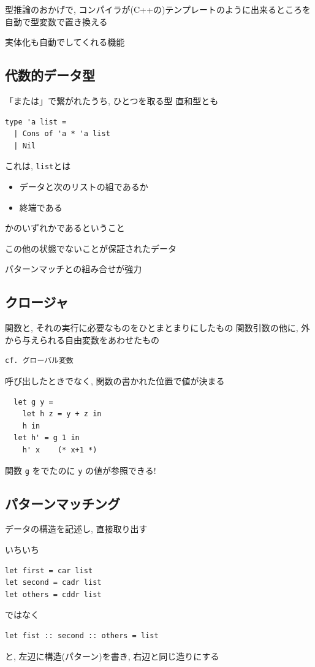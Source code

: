 \documentclass[papersize,30pt,slide]{jsarticle}
\begin{document}
型推論のおかげで, コンパイラが(C++の)テンプレートのように出来るところを自動で型変数で置き換える

実体化も自動でしてくれる機能

\newpage

\subsection{代数的データ型}
「または」で繋がれたうち, ひとつを取る型 直和型とも

\begin{lstlisting}
type 'a list =
  | Cons of 'a * 'a list
  | Nil
\end{lstlisting}
これは, \lstinline|list|とは
\begin{itemize}
\item データと次のリストの組であるか
\item 終端である
\end{itemize}
かのいずれかであるということ

この他の状態でないことが保証されたデータ

パターンマッチとの組み合せが強力

\newpage
\subsection{クロージャ}
関数と, それの実行に必要なものをひとまとまりにしたもの
関数引数の他に, 外から与えられる自由変数をあわせたもの

\begin{verbatim}
cf. グローバル変数
\end{verbatim}
呼び出したときでなく, 関数の書かれた位置で値が決まる

\begin{lstlisting}
  let g y =
    let h z = y + z in
    h in
  let h' = g 1 in
    h' x    (* x+1 *)
\end{lstlisting}
関数 \lstinline|g| をでたのに \lstinline|y| の値が参照できる!

\newpage
\subsection{パターンマッチング}
データの構造を記述し, 直接取り出す

いちいち
\begin{lstlisting}
let first = car list
let second = cadr list
let others = cddr list
\end{lstlisting}
ではなく
\begin{lstlisting}
let fist :: second :: others = list
\end{lstlisting}
と, 左辺に構造(パターン)を書き, 右辺と同じ造りにする
\end{document}
